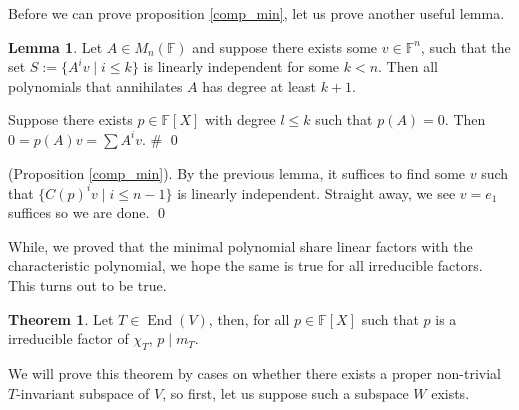 \documentclass[
]{article}
\theoremstyle{definition}
\newtheorem{theorem}{Theorem}
\newtheorem{lemma}{Lemma}[section]
\theoremstyle{definition}
\begin{document}
Before we can prove proposition \ref{comp_min}, let us prove another
useful lemma.

\begin{lemma}
  Let \(A \in M_n(\mathbb{F})\) and suppose there exists some \(v \in \mathbb{F}^n\),
  such that the set \(S := \{A^i v \mid i \le k \}\) is linearly independent for 
  some \(k < n\). Then all polynomials that annihilates \(A\) has degree at 
  least \(k + 1\).
\end{lemma}
\proof

Suppose there exists \(p \in \mathbb{F}[X]\) with degree \(l \le k\)
such that \(p(A) = 0\). Then \(0 = p(A)v = \sum A^i v\). \# \qed

\proof

(Proposition \ref{comp_min}). By the previous lemma, it suffices to find
some \(v\) such that \(\{C(p)^i v \mid i \le n - 1\}\) is linearly
independent. Straight away, we see \(v = e_1\) suffices so we are done.
\qed

While, we proved that the minimal polynomial share linear factors with
the characteristic polynomial, we hope the same is true for all
irreducible factors. This turns out to be true.

\begin{theorem}
  Let \(T \in \mathop{\mathrm{End}}(V)\), then, for all \(p \in \mathbb{F}[X]\) such that 
  \(p\) is a irreducible factor of \(\chi_T\), \(p \mid m_T\).
\end{theorem}
\proof

We will prove this theorem by cases on whether there exists a proper
non-trivial \(T\)-invariant subspace of \(V\), so first, let us suppose
such a subspace \(W\) exists.
\end{document}
